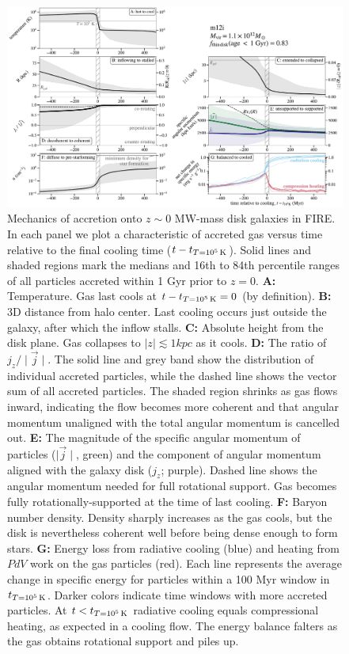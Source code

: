 \documentclass[fleqn,usenatbib]{mnras}
\newcommand{\tcon}{t_{T=10^5\,{\rm K}}}
\begin{document}
\begin{figure}
\includegraphics[width=\textwidth]{figures/before_and_after/before_and_after_m12i_md.pdf}
\caption{
Mechanics of accretion onto $z\sim0$ MW-mass disk galaxies in FIRE.
In each panel we plot a characteristic of accreted gas versus time relative to the final cooling time ($t - \tcon$).
Solid lines and shaded regions mark the medians and 16th to 84th percentile ranges of all particles accreted within 1 Gyr prior to $z=0$.
\textbf{A:}
Temperature.
Gas last cools at $t - \tcon = 0$ (by definition).
\textbf{B:}
3D distance from halo center.
Last cooling occurs just outside the galaxy, after which the inflow stalls.
\textbf{C:}
Absolute height from the disk plane.
Gas collapses to $\vert z \vert \lesssim 1 kpc$ as it cools.
\textbf{D:}
The ratio of $j_z / \mid \vec j \mid$.
The solid line and grey band show the distribution of individual accreted particles, while the dashed line shows the vector sum of all accreted particles.
The shaded region shrinks as gas flows inward, indicating the flow becomes more coherent and that angular momentum unaligned with the total angular momentum is cancelled out.
\textbf{E:}
The magnitude of the specific angular momentum of particles ($\mid\vec{j}\mid$, green) and the component of angular momentum aligned with the galaxy disk ($j_z$; purple).
Dashed line shows the angular momentum needed for full rotational support.
Gas becomes fully rotationally-supported at the time of last cooling.
\textbf{F:}
Baryon number density.
Density sharply increases as the gas cools, but the disk is nevertheless coherent well before being dense enough to form stars.
\textbf{G:}
Energy loss from radiative cooling (blue) and heating from $PdV$ work on the gas particles (red).
Each line represents the average change in specific energy for particles within a 100 Myr window in $\tcon$.
Darker colors indicate time windows with more accreted particles.
At $t<\tcon$ radiative cooling equals compressional heating, as expected in a cooling flow.
The energy balance falters as the gas obtains rotational support and piles up.
}
\label{f: before and after}
\end{figure}
\end{document}
